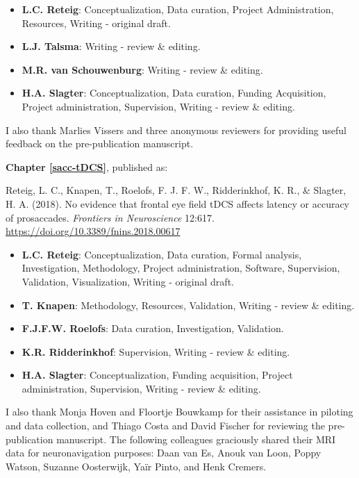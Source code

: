 \documentclass[11pt,english,]{memoir}
\providecommand{\tightlist}{%
  \setlength{\itemsep}{0pt}\setlength{\parskip}{0pt}}
\begin{document}
\begin{itemize}
\tightlist
\item
  \textbf{L.C. Reteig}: Conceptualization, Data curation, Project Administration, Resources, Writing - original draft.
\item
  \textbf{L.J. Talsma}: Writing - review \& editing.
\item
  \textbf{M.R. van Schouwenburg}: Writing - review \& editing.
\item
  \textbf{H.A. Slagter}: Conceptualization, Data curation, Funding Acquisition, Project administration, Supervision, Writing - review \& editing.
\end{itemize}

\begin{list}{}{\leftmargin=1.5em\rightmargin=0pt}
\item
I also thank Marlies Vissers and three anonymous reviewers for providing useful feedback on the pre-publication manuscript.
\end{list}

\textbf{Chapter \ref{sacc-tDCS}}, published as:

Reteig, L. C., Knapen, T., Roelofs, F. J. F. W., Ridderinkhof, K. R., \& Slagter, H. A. (2018). No evidence that frontal eye field tDCS affects latency or accuracy of prosaccades. \emph{Frontiers in Neuroscience} 12:617. \url{https://doi.org/10.3389/fnins.2018.00617}

\begin{itemize}
\tightlist
\item
  \textbf{L.C. Reteig}: Conceptualization, Data curation, Formal analysis, Investigation, Methodology, Project administration, Software, Supervision, Validation, Visualization, Writing - original draft.
\item
  \textbf{T. Knapen}: Methodology, Resources, Validation, Writing - review \& editing.
\item
  \textbf{F.J.F.W. Roelofs}: Data curation, Investigation, Validation.
\item
  \textbf{K.R. Ridderinkhof}: Supervision, Writing - review \& editing.
\item
  \textbf{H.A. Slagter}: Conceptualization, Funding acquisition, Project administration, Supervision, Writing - review \& editing.
\end{itemize}

\begin{list}{}{\leftmargin=1.5em\rightmargin=0pt}
\item
I also thank Monja Hoven and Floortje Bouwkamp for their assistance in piloting and data collection, and Thiago Costa and David Fischer for reviewing the pre-publication manuscript. The following colleagues graciously shared their MRI data for neuronavigation purposes: Daan van Es, Anouk van Loon, Poppy Watson, Suzanne Oosterwijk, Yaïr Pinto, and Henk Cremers.
\end{list}
\end{document}
